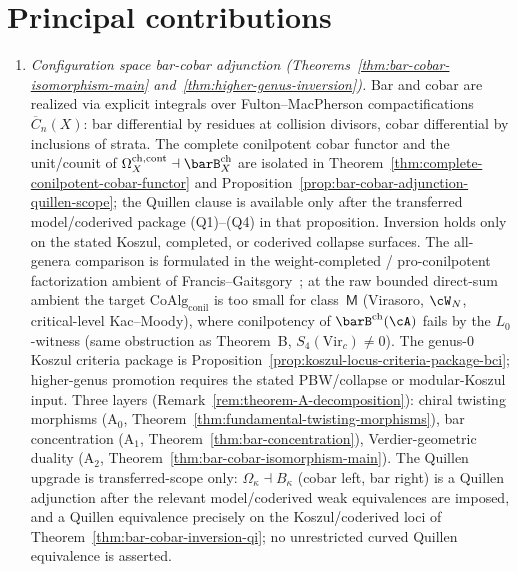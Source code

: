 \section{Principal contributions}\label{sec:principal-contributions}

\begin{enumerate}[label=\emph{(\arabic*)}]

\item \emph{Configuration space bar-cobar adjunction
 (Theorems~\ref{thm:bar-cobar-isomorphism-main}
 and~\ref{thm:higher-genus-inversion}).}
 Bar and cobar are realized via explicit integrals over
 Fulton--MacPherson compactifications $\overline{C}_n(X)$:
 bar differential by residues at collision divisors, cobar
 differential by inclusions of strata. The complete conilpotent cobar
 functor and the unit/counit of
 $\Omega_X^{\mathrm{ch,cont}}\dashv\barB_X^{\mathrm{ch}}$ are isolated in
 Theorem~\ref{thm:complete-conilpotent-cobar-functor} and
 Proposition~\ref{prop:bar-cobar-adjunction-quillen-scope}; the
 Quillen clause is available only after the transferred
 model/coderived package \textup{(Q1)--(Q4)} in that proposition.
 Inversion holds only on the stated Koszul, completed, or coderived
 collapse surfaces. The all-genera comparison is formulated in the
 weight-completed / pro-conilpotent factorization ambient of
 Francis--Gaitsgory~\cite{FG12}; at the raw bounded direct-sum
 ambient the target $\mathrm{CoAlg}_{\mathrm{conil}}$ is
 too small for class~$\mathsf{M}$ (Virasoro, $\cW_N$,
 critical-level Kac--Moody), where conilpotency of
 $\barB^{\mathrm{ch}}(\cA)$ fails by the $L_0$-witness
 (same obstruction as Theorem~B, $S_4(\mathrm{Vir}_c)\neq 0$).
 The genus-$0$ Koszul criteria package is
 Proposition~\ref{prop:koszul-locus-criteria-package-bci}; higher-genus
 promotion requires the stated PBW/collapse or modular-Koszul input.
 Three layers
 (Remark~\ref{rem:theorem-A-decomposition}):
 chiral twisting morphisms
 ($\mathrm{A}_0$, Theorem~\ref{thm:fundamental-twisting-morphisms}),
 bar concentration
 ($\mathrm{A}_1$, Theorem~\ref{thm:bar-concentration}),
 Verdier-geometric duality
 ($\mathrm{A}_2$, Theorem~\ref{thm:bar-cobar-isomorphism-main}).
 The Quillen upgrade is transferred-scope only:
 $\Omega_\kappa \dashv B_\kappa$ \textup{(}cobar left, bar right\textup{)}
 is a Quillen adjunction after the relevant model/coderived weak
 equivalences are imposed, and a Quillen equivalence precisely on the
 Koszul/coderived loci of
 Theorem~\ref{thm:bar-cobar-inversion-qi}; no unrestricted curved
 Quillen equivalence is asserted.


\end{enumerate}
